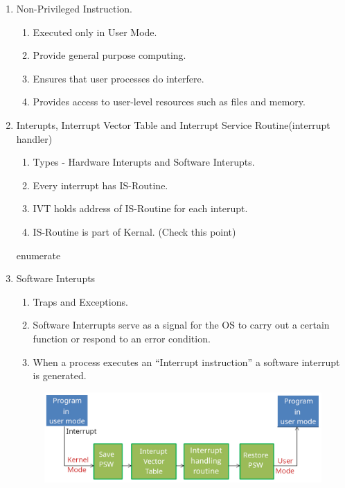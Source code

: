 \begin{enumerate}
  \item Non-Privileged Instruction.
  \begin{enumerate}
        \item Executed only in User Mode.
        \item Provide general purpose computing.
        \item Ensures that user processes do interfere.
        \item Provides access to user-level resources such as files and memory.
  \end{enumerate}


  \item Interupts, Interrupt Vector Table and Interrupt Service Routine(interrupt handler)
  \begin{enumerate}
        \item Types - Hardware Interupts and Software Interupts.
        \item Every interrupt has IS-Routine.
        \item IVT holds address of IS-Routine for each interupt.
        \item IS-Routine is part of Kernal. (Check this point)
  \end{enumerate}{enumerate}


  \item Software Interupts
  \begin{enumerate}
        \item Traps and Exceptions.
        \item Software Interrupts serve as a signal for the OS to carry out a certain function or respond to an error condition.
        \item When a process executes an “Interrupt instruction” a software interrupt is generated.
  \end{enumerate}

  \begin{figure}[h]
      \centering   \includegraphics[scale=1.6]{./images/Interupt_01.jpeg}
  \end{figure}


\end{enumerate}
